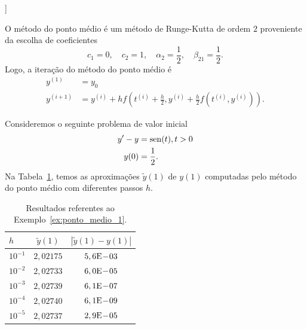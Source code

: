 \begin{flushleft}
  [[tag:revisar]]
\end{flushleft}

O método do ponto médio é um método de Runge-Kutta de ordem $2$ proveniente da escolha de coeficientes
\begin{equation}
  c_1 = 0, \quad c_2 = 1, \quad \alpha_2 = \frac{1}{2},\quad \beta_{21}=\frac{1}{2}.
\end{equation}
Logo, a iteração do método do ponto médio é
\begin{align}
  y^{(1)} &= y_0\\
  y^{(i+1)} &= y^{(i)} + hf\left(t^{(i)}+\frac{h}{2},y^{(i)}+\frac{h}{2}f(t^{(i)},y^{(i)})\right).
\end{align}

\begin{ex}\label{ex:ponto_medio_1}
  Consideremos o seguinte problema de valor inicial
  \begin{align}
    y' - y &= \operatorname{sen}(t), t>0\\
    y(0) &= \frac{1}{2}.
  \end{align}
  Na Tabela~\ref{tab:ex_ponto_medio_1}, temos as aproximações $\tilde{y}(1)$ de $y(1)$ computadas pelo método do ponto médio com diferentes passos $h$.
 
  \begin{table}[h!]
    \centering
    \begin{tabular}{l|cc}
      $h$ & $\tilde{y}(1)$ & $|\tilde{y}(1)-y(1)|$\\\hline
      $10^{-1}$ & $2,02175$ & $5,6\mathrm{E}\!-\!03$ \\
      $10^{-2}$ & $2,02733$ & $6,0\mathrm{E}\!-\!05$ \\
      $10^{-3}$ & $2,02739$ & $6,1\mathrm{E}\!-\!07$ \\
      $10^{-4}$ & $2,02740$ & $6,1\mathrm{E}\!-\!09$ \\
      $10^{-5}$ & $2,02737$ & $2,9\mathrm{E}\!-\!05$ \\\hline
    \end{tabular}
    \caption{Resultados referentes ao Exemplo~\ref{ex:ponto_medio_1}.}
    \label{tab:ex_ponto_medio_1}
  \end{table}





\end{ex}

